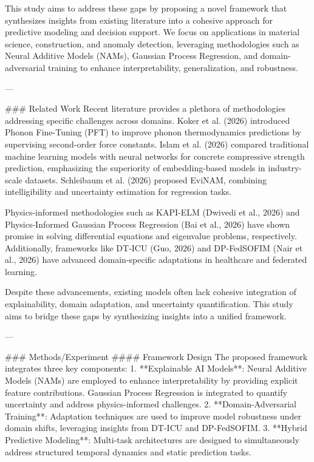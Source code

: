 This study aims to address these gaps by proposing a novel framework that synthesizes insights from existing literature into a cohesive approach for predictive modeling and decision support. We focus on applications in material science, construction, and anomaly detection, leveraging methodologies such as Neural Additive Models (NAMs), Gaussian Process Regression, and domain-adversarial training to enhance interpretability, generalization, and robustness.

---

### Related Work
Recent literature provides a plethora of methodologies addressing specific challenges across domains. Koker et al. (2026) introduced Phonon Fine-Tuning (PFT) to improve phonon thermodynamics predictions by supervising second-order force constants. Islam et al. (2026) compared traditional machine learning models with neural networks for concrete compressive strength prediction, emphasizing the superiority of embedding-based models in industry-scale datasets. Schleibaum et al. (2026) proposed EviNAM, combining intelligibility and uncertainty estimation for regression tasks.

Physics-informed methodologies such as KAPI-ELM (Dwivedi et al., 2026) and Physics-Informed Gaussian Process Regression (Bai et al., 2026) have shown promise in solving differential equations and eigenvalue problems, respectively. Additionally, frameworks like DT-ICU (Guo, 2026) and DP-FedSOFIM (Nair et al., 2026) have advanced domain-specific adaptations in healthcare and federated learning.

Despite these advancements, existing models often lack cohesive integration of explainability, domain adaptation, and uncertainty quantification. This study aims to bridge these gaps by synthesizing insights into a unified framework.

---

### Methods/Experiment
#### Framework Design
The proposed framework integrates three key components:
1. **Explainable AI Models**: Neural Additive Models (NAMs) are employed to enhance interpretability by providing explicit feature contributions. Gaussian Process Regression is integrated to quantify uncertainty and address physics-informed challenges.
2. **Domain-Adversarial Training**: Adaptation techniques are used to improve model robustness under domain shifts, leveraging insights from DT-ICU and DP-FedSOFIM.
3. **Hybrid Predictive Modeling**: Multi-task architectures are designed to simultaneously address structured temporal dynamics and static prediction tasks.

